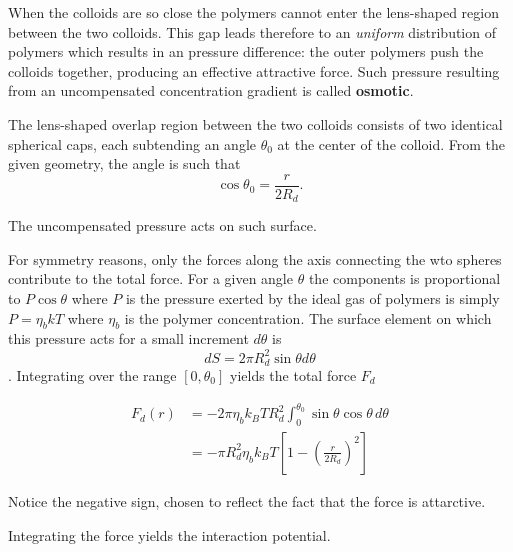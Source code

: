 \documentclass[
  letterpaper,
  enabledeprecatedfontcommands]{report}
\begin{document}
\begin{tcolorbox}[enhanced jigsaw, toprule=.15mm, opacityback=0, colbacktitle=quarto-callout-note-color!10!white, title=\textcolor{quarto-callout-note-color}{\faInfo}\hspace{0.5em}{Force-based derivation of the AO interaction}, leftrule=.75mm, rightrule=.15mm, bottomtitle=1mm, breakable, colframe=quarto-callout-note-color-frame, colback=white, toptitle=1mm, left=2mm, titlerule=0mm, coltitle=black, arc=.35mm, bottomrule=.15mm, opacitybacktitle=0.6]

When the colloids are so close the polymers cannot enter the lens-shaped
region between the two colloids. This gap leads therefore to an
\emph{uniform} distribution of polymers which results in an pressure
difference: the outer polymers push the colloids together, producing an
effective attractive force. Such pressure resulting from an
uncompensated concentration gradient is called \textbf{osmotic}.

The lens-shaped overlap region between the two colloids consists of two
identical spherical caps, each subtending an angle \(\theta_0\) at the
center of the colloid. From the given geometry, the angle is such that
\[\cos\theta_0 = \dfrac{r}{2R_d}.\]

The uncompensated pressure acts on such surface.

For symmetry reasons, only the forces along the axis connecting the wto
spheres contribute to the total force. For a given angle \(\theta\) the
components is proportional to \(P\cos\theta\) where \(P\) is the
pressure exerted by the ideal gas of polymers is simply \(P=\eta_b kT\)
where \(\eta_b\) is the polymer concentration. The surface element on
which this pressure acts for a small increment \(d\theta\) is
\[dS = 2\pi R_d^2\sin\theta d\theta\]. Integrating over the range
\([0,\theta_0]\) yields the total force \(F_d\)

\[
\begin{aligned}
F_d(r) &= -2\pi \eta_b k_B T R_d^2 \int_0^{\theta_0} \sin\theta \cos\theta \, d\theta \\
&= -\pi R_d^2 \eta_b k_B T \left[1 - \left(\frac{r}{2R_d}\right)^2\right]
\end{aligned}
\]

Notice the negative sign, chosen to reflect the fact that the force is
attarctive.

Integrating the force yields the interaction potential.

\end{tcolorbox}
\end{document}
